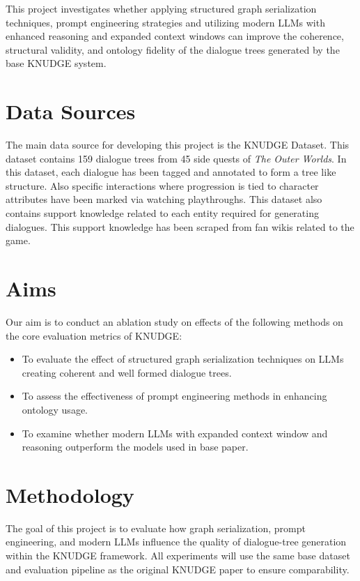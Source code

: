 \documentclass[12pt,a4paper]{article}
\begin{document}
This project investigates whether applying structured graph serialization techniques, prompt engineering strategies and utilizing modern LLMs with enhanced reasoning and expanded context windows can improve the coherence, structural validity, and ontology fidelity of the dialogue trees generated by the base KNUDGE system.

\section{Data Sources}
The main data source for developing this project is the KNUDGE \cite{weir2024knudge} Dataset. This dataset contains 159 dialogue trees from 45 side quests of \textit{The Outer Worlds}. In this dataset, each dialogue has been tagged and annotated to form a tree like structure. Also specific interactions where progression is tied to character attributes have been marked via watching playthroughs. This dataset also contains support knowledge related to each entity required for generating dialogues. This support knowledge has been scraped from fan wikis related to the game.

\section{Aims}
Our aim is to conduct an ablation study on effects of the following methods on the core evaluation metrics of KNUDGE:
\begin{itemize}
	\item To evaluate the effect of structured graph serialization techniques on LLMs creating coherent and well formed dialogue trees.
	\item To assess the effectiveness of prompt engineering methods in enhancing ontology usage.
	\item To examine whether modern LLMs with expanded context window and reasoning outperform the models used in base paper.
\end{itemize}

\section{Methodology}

The goal of this project is to evaluate how graph serialization, prompt engineering, and modern LLMs influence the quality of dialogue-tree generation within the KNUDGE framework. All experiments will use the same base dataset and evaluation pipeline as the original KNUDGE paper to ensure comparability.
\end{document}
